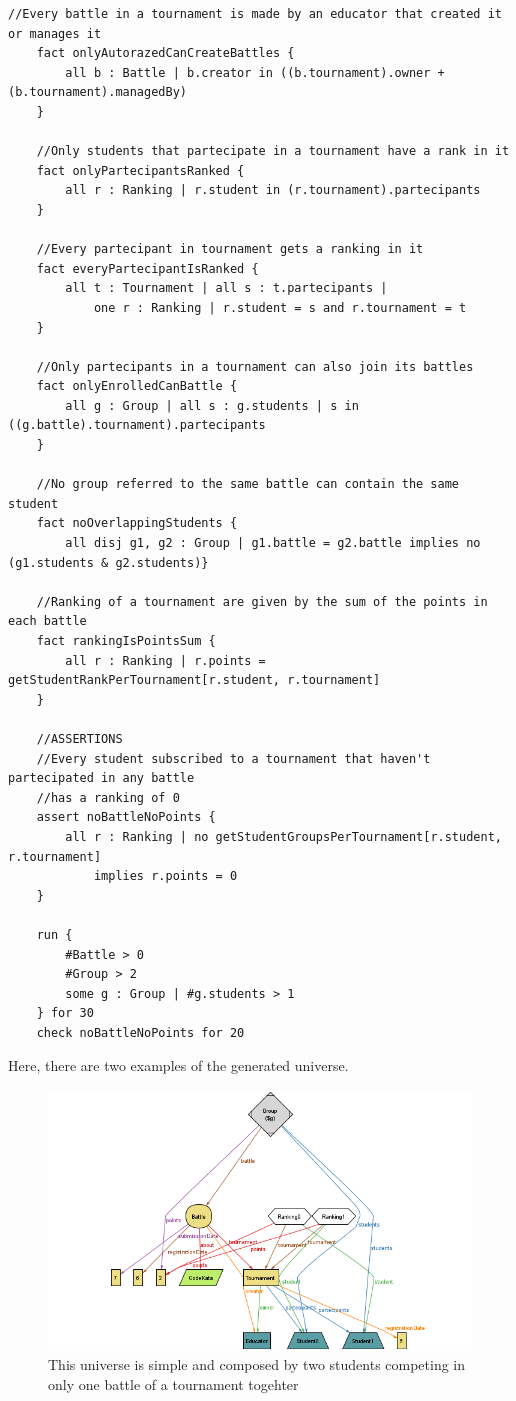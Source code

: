 \documentclass[12pt, a4paper]{report}
\begin{document}
\begin{lstlisting}[language=alloy]
    //Every battle in a tournament is made by an educator that created it or manages it
    fact onlyAutorazedCanCreateBattles {
        all b : Battle | b.creator in ((b.tournament).owner + (b.tournament).managedBy)
    }
    
    //Only students that partecipate in a tournament have a rank in it
    fact onlyPartecipantsRanked {
        all r : Ranking | r.student in (r.tournament).partecipants
    }
    
    //Every partecipant in tournament gets a ranking in it
    fact everyPartecipantIsRanked {
        all t : Tournament | all s : t.partecipants |
            one r : Ranking | r.student = s and r.tournament = t
    }
    
    //Only partecipants in a tournament can also join its battles
    fact onlyEnrolledCanBattle {
        all g : Group | all s : g.students | s in ((g.battle).tournament).partecipants
    }
    
    //No group referred to the same battle can contain the same student
    fact noOverlappingStudents {
        all disj g1, g2 : Group | g1.battle = g2.battle implies no (g1.students & g2.students)}
    
    //Ranking of a tournament are given by the sum of the points in each battle 
    fact rankingIsPointsSum {
        all r : Ranking | r.points = getStudentRankPerTournament[r.student, r.tournament]
    }
    
    //ASSERTIONS 
    //Every student subscribed to a tournament that haven't partecipated in any battle 
    //has a ranking of 0
    assert noBattleNoPoints {
        all r : Ranking | no getStudentGroupsPerTournament[r.student, r.tournament] 
            implies r.points = 0
    }
    
    run {
        #Battle > 0
        #Group > 2
        some g : Group | #g.students > 1
    } for 30
    check noBattleNoPoints for 20
\end{lstlisting}
\newpage
Here, there are two examples of the generated universe.
\begin{figure}[H]
    \centering
    \includegraphics[width=0.8\linewidth]{images/AlloyGen2.png}
    \caption{This universe is simple and composed by two students competing in only one battle of a tournament togehter}
\end{figure}
\end{document}
